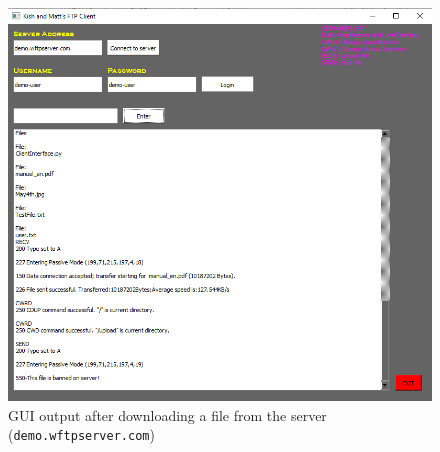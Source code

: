 \documentclass[10pt, conference]{IEEEtran}
\def\code#1{\texttt{#1}}
\begin{document}
\begin{appendices}
\begin{figure}[h!]
\renewcommand{\thefigure}{\arabic{figure}}
\centering
\includegraphics[scale=0.8]{WftpGUI.png}
\caption{GUI output after downloading a file from the server (\code{demo.wftpserver.com})}
\label{fig: Wftp GUI}
\end{figure}

\end{appendices}
\end{document}
